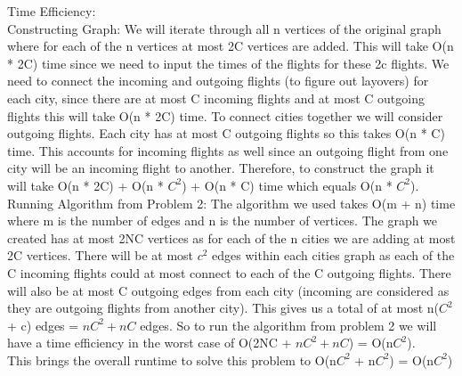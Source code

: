 \documentclass[12pt]{article}
\begin{document}
Time Efficiency: \\

Constructing Graph: We will iterate through all n vertices of the original graph where for each of the n vertices at most 2C vertices are added. This will take O(n * 2C) time since we need to input the times of the flights for these 2c flights. We need to connect the incoming and outgoing flights (to figure out layovers) for each city, since there are at most C incoming flights and at most C outgoing flights this will take O(n * 2C) time. To connect cities together we will consider outgoing flights. Each city has at most C outgoing flights so this takes O(n * C) time. This accounts for incoming flights as well since an outgoing flight from one city will be an incoming flight to another. Therefore, to construct the graph it will take O(n * 2C) + O(n * $C^2$) + O(n * C) time which equals O(n * $C^2$).\\

Running Algorithm from Problem 2: The algorithm we used takes O(m + n) time where m is the number of edges and n is the number of vertices. The graph we created has at most 2NC vertices as for each of the n cities we are adding at most 2C vertices. There will be at most $c^2$ edges within each cities graph as each of the C incoming flights could at most connect to each of the C outgoing flights. There will also be at most C outgoing edges from each city (incoming are considered as they are outgoing flights from another city). This gives us a total of at most n($C^2$ + c) edges = $nC^2 + nC$ edges. So to run the algorithm from problem 2 we will have a time efficiency in the worst case of O(2NC + $nC^2 + nC$) = O(n$C^2$).\\

This brings the overall runtime to solve this problem to O(n$C^2$ + n$C^2$) = O(n$C^2$)
\end{document}
